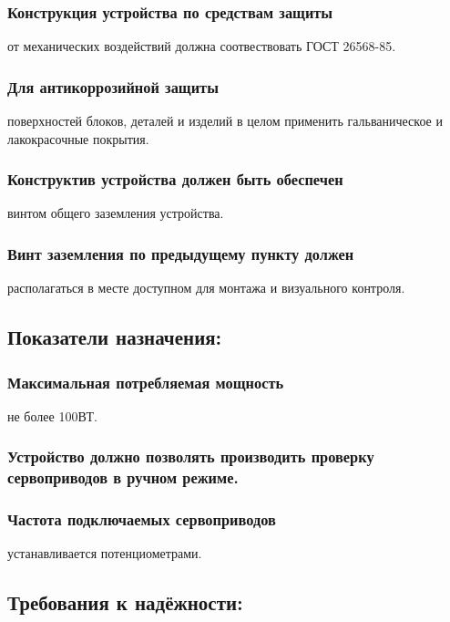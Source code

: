 \documentclass[a4paper]{bsuir-tor}
\begin{document}
  \subsubsection{Конструкция устройства по средствам защиты}
  от механических воздействий должна соотвествовать ГОСТ 26568-85.
  
  \subsubsection{Для антикоррозийной защиты }
  поверхностей блоков, деталей и изделий в целом применить
  гальваническое и лакокрасочные покрытия.
  
  \subsubsection{Конструктив устройства должен быть обеспечен}
  винтом общего заземления устройства.
  
  \subsubsection{Винт заземления по предыдущему пункту должен }
  располагаться в месте доступном для монтажа и визуального контроля.

\subsection{Показатели назначения:}

\subsubsection{Максимальная потребляемая мощность}
не более 100ВТ.

\subsubsection{Устройство должно позволять производить проверку сервоприводов
  в ручном режиме.}

\subsubsection{Частота подключаемых сервоприводов } устанавливается
потенциометрами.


\subsection{Требования к надёжности: }
\end{document}
